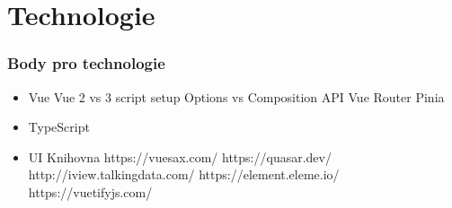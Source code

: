 
\chapter{Technologie}
\label{chap:technologie}

\subsection{Body pro technologie}
\begin{itemize}
    \item Vue
    \subitem Vue 2 vs 3
    \subitem script setup
    \subitem Options vs Composition API
    \subitem Vue Router
    \subitem Pinia
    \item TypeScript
    \item UI Knihovna
    \subitem https://vuesax.com/
    \subitem https://quasar.dev/
    \subitem http://iview.talkingdata.com/
    \subitem https://element.eleme.io/
    \subitem https://vuetifyjs.com/
\end{itemize}
